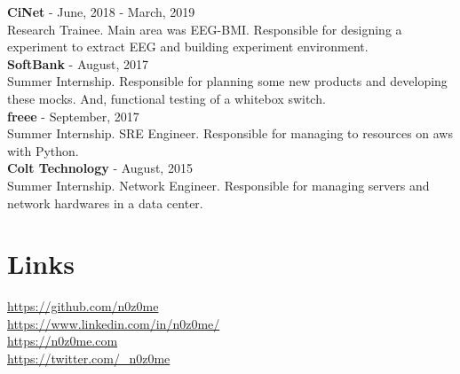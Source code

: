 \documentclass[11pt]{article} %
\begin{document}
\begin{paracol}{2}
\textbf{\color{subtitle}CiNet} \hspace{0.5mm} {\color{subtitle} - June, 2018 - March, 2019}\\
Research Trainee. Main area was EEG-BMI. Responsible for designing a experiment to extract EEG
 and building experiment environment.\\

\textbf{\color{subtitle}SoftBank} \hspace{0.5mm} {\color{subtitle} - August, 2017}\\
Summer Internship. Responsible for planning some new products and developing these mocks. 
And, functional testing of a whitebox switch.\\

\textbf{\color{subtitle}freee} \hspace{0.5mm} {\color{subtitle} - September, 2017}\\
Summer Internship. SRE Engineer. Responsible for managing to resources on aws with Python.\\

\textbf{\color{subtitle}Colt Technology} \hspace{0.5mm} {\color{subtitle} - August, 2015}\\
Summer Internship. Network Engineer. Responsible for managing servers and network hardwares in a data center.\\


\vspace{0.5cm}


\section{Links}
{\faGithub} \hspace{1mm} \href{https://github.com/n0z0me}{https://github.com/n0z0me}\\ %
{\faLinkedinSquare} \hspace{1mm} \href{https://www.linkedin.com/in/n0z0me/}{https://www.linkedin.com/in/n0z0me/}\\ %
{\small\faDesktop} \hspace{0.8mm} \href{https://n0z0me.com}{https://n0z0me.com}\\ %
{\faTwitterSquare} \hspace{1mm} \href{https://twitter.com/\_n0z0me}{https://twitter.com/\_n0z0me}\\

\end{paracol}

\end{document}
